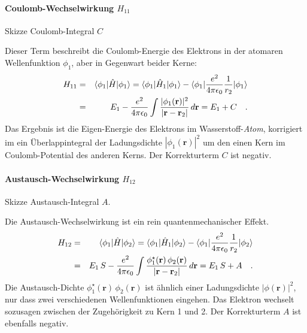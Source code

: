\paragraph{Coulomb-Wechselwirkung $H_{11}$}  
\begin{marginfigure}
\caption{Skizze Coulomb-Integral $C$ }
\end{marginfigure}
%
Dieser Term beschreibt die Coulomb-Energie des Elektrons in der atomaren Wellenfunktion $\phi_1$, aber in Gegenwart beider Kerne:
\begin{eqnarray}
H_{11} &= &  \braket{\phi_1 | \hat{H} | \phi_1} = \braket{\phi_1 | \hat{H}_1 | \phi_1}  - \braket{\phi_1 |  \frac{e^2}{4 \pi \epsilon_0} \frac{1}{r_{2}} | \phi_1}  \\
 & = & E_1 - \frac{e^2}{4 \pi \epsilon_0} \int \frac{|\phi_1(\mathbf{r})|^2 }{|\mathbf{r} - \mathbf{r}_2  |} \, d\mathbf{r} = E_1 + C \quad .
\end{eqnarray} 
Das Ergebnis ist die Eigen-Energie des Elektrons im Wasserstoff-\emph{Atom}, korrigiert im ein Überlappintegral der Ladungsdichte ${|\phi_1(\mathbf{r})|^2 }$ um den einen Kern im Coulomb-Potential des anderen Kerns. Der Korrekturterm $C$ ist negativ.




\paragraph{Austausch-Wechselwirkung $H_{12}$} 
\begin{marginfigure}
\caption{Skizze Austausch-Integral $A$.}
\end{marginfigure}
%
Die Austausch-Wechselwirkung ist ein rein quantenmechanischer Effekt.
\begin{eqnarray}
H_{12} &= &  \braket{\phi_1 | \hat{H} | \phi_2} = \braket{\phi_1 | \hat{H}_1 | \phi_2}  - \braket{\phi_1 |  \frac{e^2}{4 \pi \epsilon_0} \frac{1}{r_{2}} | \phi_2}  \\
 & = & E_1 \, S - \frac{e^2}{4 \pi \epsilon_0} \int \frac{ \phi_1^\star(\mathbf{r}) \, \phi_2(\mathbf{r})  }{|\mathbf{r} - \mathbf{r}_2  |} \, d\mathbf{r} = E_1 \, S + A \quad .
\end{eqnarray}
Die Austausch-Dichte $\phi_1^\star(\mathbf{r}) \, \phi_2(\mathbf{r})$ ist ähnlich einer Ladungsdichte $|\phi(\mathbf{r})|^2$, nur dass zwei verschiedenen Wellenfunktionen eingehen. Das Elektron wechselt sozusagen zwischen der Zugehörigkeit zu Kern 1 und 2. Der Korrekturterm $A$ ist ebenfalls negativ.



